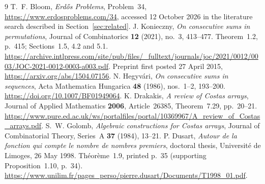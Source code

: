 \documentclass[10pt]{amsart}
\theoremstyle{remark}
\begin{document}
\begin{thebibliography}{9}
T.~F. Bloom, \emph{Erd\H{o}s Problems}, Problem~34,
\url{https://www.erdosproblems.com/34}, accessed 12 October 2026
in the literature search described in Section~\ref{sec:related}.
J. Konieczny, \emph{On consecutive sums in permutations},
Journal of Combinatorics \textbf{12} (2021), no.~3, 413--477.
Theorem~1.2, p.~415; Sections~1.5, 4.2 and 5.1.
\url{https://archive.intlpress.com/site/pub/files/_fulltext/journals/joc/2021/0012/0003/JOC-2021-0012-0003-a003.pdf}.
Preprint first posted 27 April 2015, \url{https://arxiv.org/abs/1504.07156}.
N. Hegyv\'ari, \emph{On consecutive sums in sequences},
Acta Mathematica Hungarica \textbf{48} (1986), nos.~1--2, 193--200.
\url{https://doi.org/10.1007/BF01949064}.
K. Drakakis, \emph{A review of Costas arrays},
Journal of Applied Mathematics \textbf{2006}, Article~26385,
Theorem~7.29, pp.~20--21.
\url{https://www.pure.ed.ac.uk/ws/portalfiles/portal/10369967/A_review_of_Costas_arrays.pdf}.
S.~W. Golomb, \emph{Algebraic constructions for Costas arrays},
Journal of Combinatorial Theory, Series~A \textbf{37} (1984), 13--21.
P. Dusart, \emph{Autour de la fonction qui compte le nombre de nombres
premiers}, doctoral thesis, Universit\'e de Limoges, 26 May 1998.
Th\'eor\`eme~1.9, printed p.~35 (supporting Proposition~1.10, p.~34).
\url{https://www.unilim.fr/pages_perso/pierre.dusart/Documents/T1998_01.pdf}.
\end{thebibliography}
\end{document}
